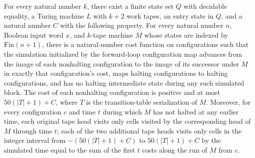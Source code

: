 \begin{theorem}
\label{Turing.StepBlock.exists_forwardLoopTM}
\leanok
{}
For every natural number $k$, there exist a finite state set $Q$ with decidable
equality, a Turing machine $L$ with $k+2$ work tapes, an entry state in $Q$, and a
natural number $C$ with the following property. For every natural number $n$, Boolean
input word $x$, and $k$-tape machine $M$ whose states are indexed by
$\mathrm{Fin}(n+1)$, there is a natural-number cost function on configurations such that
the simulation initialized by the forward-loop configuration map advances from the image
of each nonhalting configuration to the image of its successor under $M$ in exactly that
configuration's cost, maps halting configurations to halting configurations, and has no
halting intermediate state during any such simulated block. The cost of each nonhalting
configuration is positive and at most $50(|T|+1)+C$, where $T$ is the transition-table
serialization of $M$. Moreover, for every configuration $c$ and time $t$ during which
$M$ has not halted at any earlier time, each original tape head visits only cells
visited by the corresponding head of $M$ through time $t$; each of the two additional
tape heads visits only cells in the integer interval from $-(50(|T|+1)+C)$ to
$50(|T|+1)+C$ by the simulated time equal to the sum of the first $t$ costs along the
run of $M$ from $c$.
\end{theorem}
